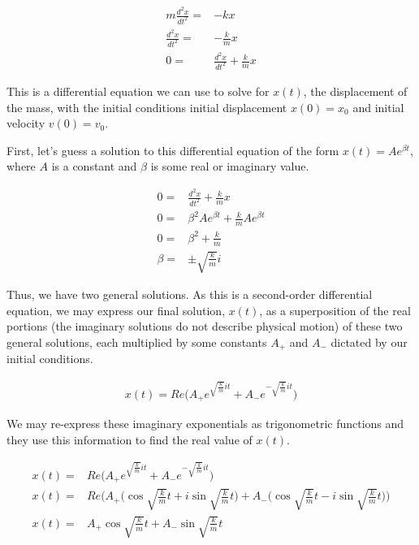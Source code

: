 \documentclass{article}
\begin{document}
\begin{eqnarray}
    m\frac{d^2x}{dt^2} =& -kx \\
    \frac{d^2x}{dt^2} =& -\frac{k}{m}x \\
    0 =& \frac{d^2x}{dt^2} + \frac{k}{m}x
\end{eqnarray}

This is a differential equation we can use to solve for $x(t)$, the displacement of the mass, with the initial conditions initial displacement $x(0) = x_0$ and initial velocity $v(0) = v_0$.

First, let's guess a solution to this differential equation of the form $x(t) = Ae^{\beta t}$, where $A$ is a constant and $\beta$ is some real or imaginary value.

\begin{eqnarray}
    0 =& \frac{d^2x}{dt^2} + \frac{k}{m}x \\
    0 =& \beta^2 Ae^{\beta t} + \frac{k}{m} Ae^{\beta t} \\
    0 =& \beta^2 + \frac{k}{m} \\
    \beta =& \pm \sqrt{\frac{k}{m}}i
\end{eqnarray}

Thus, we have two general solutions.  As this is a second-order differential equation, we may express our final solution, $x(t)$, as a superposition of the real portions (the imaginary solutions do not describe physical motion) of these two general solutions, each multiplied by some constants $A_+$ and $A_-$ dictated by our initial conditions.  

\begin{eqnarray}
    x(t) = Re\Big(A_+e^{\sqrt{\frac{k}{m}}i t} + A_-e^{-\sqrt{\frac{k}{m}}i t}\Big)
\end{eqnarray}

We may re-express these imaginary exponentials as trigonometric functions and they use this information to find the real value of $x(t)$.

\begin{eqnarray}
    x(t) =& Re\Big(A_+e^{\sqrt{\frac{k}{m}}i t} + A_-e^{-\sqrt{\frac{k}{m}}i t}\Big) \\
    x(t) =& Re\Big(A_+\big(\cos{{\sqrt{\frac{k}{m}}t} +  i\sin{\sqrt{\frac{k}{m}}t}}\big) + A_-\big(\cos{{\sqrt{\frac{k}{m}}t} -  i\sin{\sqrt{\frac{k}{m}}t}}\big)\Big) \\
    x(t) =& A_+\cos{{\sqrt{\frac{k}{m}}t} + A_-\sin{\sqrt{\frac{k}{m}}t}}
\end{eqnarray}
\end{document}
